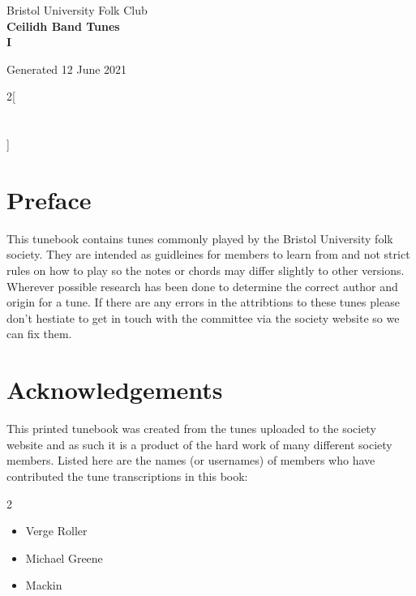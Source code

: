 \documentclass[12pt,a4paper,twoside]{article}
\makeatletter
\newcommand{\thetitle}{Ceilidh Band Tunes \\ \vspace{0.65cm} I}
\newcommand{\thedate}{12 June 2021}
\renewcommand\tableofcontents{%
    \begin{multicols}{2}[
      \centering
      \section*{\large\contentsname
        \@mkboth{%
           \MakeUppercase\contentsname}{\MakeUppercase\contentsname}}]
    \@starttoc{toc}%
    \end{multicols}
}
\makeatother
\begin{document}
\begin{titlepage}
   \begin{center}
       \large Bristol University Folk Club \\

       \vspace{4cm}
       \textbf{\Huge \thetitle}

       \vspace{0.5cm}
       Generated \thedate

       \vspace{1.5cm}

       \vfill

   \end{center}
\end{titlepage}

\tableofcontents

\section{Preface}

This tunebook contains tunes commonly played by the Bristol University folk society. They are intended as guidleines for members to learn from and not strict rules on how to play so the notes or chords may differ slightly to other versions.
Wherever possible research has been done to determine the correct author and origin for a tune. If there are any errors in the attribtions to these tunes please don't hestiate to get in touch with the committee via the society website so we can fix them.

\section{Acknowledgements}

This printed tunebook was created from the tunes uploaded to the society website and as such it is a product of the hard work of many different society members. Listed here are the names (or usernames) of members who have contributed the tune transcriptions in this book:

\begin{multicols}{2}
\begin{itemize}\item Verge Roller
\item Michael Greene
\item Mackin
\end{itemize}

\end{multicols}
\end{document}

